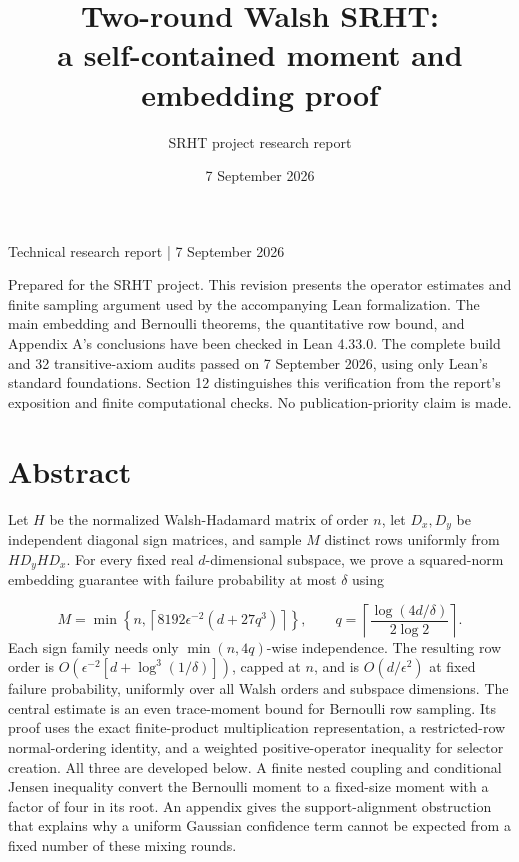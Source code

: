 \documentclass[11pt,a4paper]{article}
\title{Two-round Walsh SRHT:\\a self-contained moment and embedding proof}
\author{SRHT project research report}
\date{7 September 2026}
\begin{document}
\maketitle
Technical research report | 7 September 2026

Prepared for the SRHT project. This revision presents the operator estimates and finite sampling argument used by the accompanying Lean formalization. The main embedding and Bernoulli theorems, the quantitative row bound, and Appendix A's conclusions have been checked in Lean 4.33.0. The complete build and 32 transitive-axiom audits passed on 7 September 2026, using only Lean's standard foundations. Section 12 distinguishes this verification from the report's exposition and finite computational checks. No publication-priority claim is made.

\clearpage
\tableofcontents
\clearpage
\section*{Abstract}
Let \(H\) be the normalized Walsh-Hadamard matrix of order \(n\), let \(D_x,D_y\) be independent diagonal sign matrices, and sample \(M\) distinct rows uniformly from \(HD_yHD_x\). For every fixed real \(d\)-dimensional subspace, we prove a squared-norm embedding guarantee with failure probability at most \(\delta\) using

\begin{equation}
M=\min\left\{n,\left\lceil8192\epsilon^{-2}(d+27q^3)\right\rceil\right\},
\qquad
q=\left\lceil\frac{\log(4d/\delta)}{2\log2}\right\rceil .
\tag{A}
\end{equation}
Each sign family needs only \(\min(n,4q)\)-wise independence. The resulting row order is \(O(\epsilon^{-2}[d+\log^3(1/\delta)])\), capped at \(n\), and is \(O(d/\epsilon^2)\) at fixed failure probability, uniformly over all Walsh orders and subspace dimensions. The central estimate is an even trace-moment bound for Bernoulli row sampling. Its proof uses the exact finite-product multiplication representation, a restricted-row normal-ordering identity, and a weighted positive-operator inequality for selector creation. All three are developed below. A finite nested coupling and conditional Jensen inequality convert the Bernoulli moment to a fixed-size moment with a factor of four in its root. An appendix gives the support-alignment obstruction that explains why a uniform Gaussian confidence term cannot be expected from a fixed number of these mixing rounds.
\end{document}
